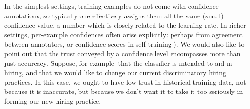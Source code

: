 \begin{example}

In the simplest settings, training examples do not come with confidence annotations,
so typically one effectively assigns them all the same (small) confidence value,
a number which is closely related to the learning rate.
In richer settings, per-example confidences often arise explicitly: 
perhaps from agreement between annotators, 
or 
confidence scores in self-training \parencite{zou2019confidence}).
We would also like to point out that the trust conveyed by a
confidence level encompasses more than just accurcacy.
Suppose, for example, that the classifier is intended to aid in hiring, and that we would like to change our current discriminatory hiring practices.
In this case, we ought to have low trust in historical training data, 
not because it is inaccurate, but because we don't want it to take it
too seriously in forming our new hiring practice.
\end{example}


